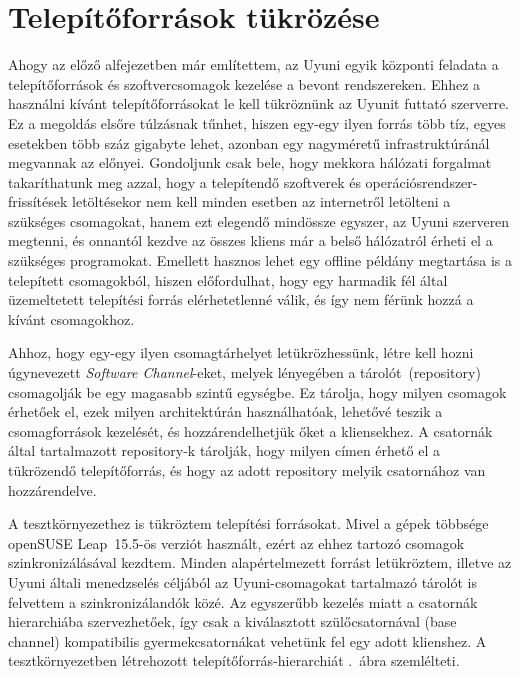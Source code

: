 \section{Telepítőforrások tükrözése}
\label{sect:reposync}
Ahogy az előző alfejezetben már említettem, az Uyuni egyik központi feladata a telepítőforrások és szoftvercsomagok kezelése a bevont rendszereken. Ehhez a használni kívánt telepítőforrásokat le kell tükröznünk az Uyunit futtató szerverre. Ez a megoldás elsőre túlzásnak tűnhet, hiszen egy-egy ilyen forrás több tíz, egyes esetekben több száz gigabyte lehet, azonban egy nagyméretű infrastruktúránál megvannak az előnyei. Gondoljunk csak bele, hogy mekkora hálózati forgalmat takaríthatunk meg azzal, hogy a telepítendő szoftverek és operációsrendszer-frissítések letöltésekor nem kell minden esetben az internetről letölteni a szükséges csomagokat, hanem ezt elegendő mindössze egyszer, az Uyuni szerveren megtenni, és onnantól kezdve az összes kliens már a belső hálózatról érheti el a szükséges programokat.
Emellett hasznos lehet egy offline példány megtartása is a telepített csomagokból, hiszen előfordulhat, hogy egy harmadik fél által üzemeltetett telepítési forrás elérhetetlenné válik, és így nem férünk hozzá a kívánt csomagokhoz.

Ahhoz, hogy egy-egy ilyen csomagtárhelyet letükrözhessünk, létre kell hozni úgynevezett \textit{Software Channel}-eket, melyek lényegében a tárolót~(repository) csomagolják be egy magasabb szintű egységbe. Ez tárolja, hogy milyen csomagok érhetőek el, ezek milyen architektúrán használhatóak, lehetővé teszik a csomagforrások kezelését, és hozzárendelhetjük őket a kliensekhez. A csatornák által tartalmazott repository-k tárolják, hogy milyen címen érhető el a tükrözendő telepítőforrás, és hogy az adott repository melyik csatornához van hozzárendelve.

A tesztkörnyezethez is tükröztem telepítési forrásokat. Mivel a gépek többsége openSUSE Leap~15.5-ös verziót használt, ezért az ehhez tartozó csomagok szinkronizálásával kezdtem. Minden alapértelmezett forrást letükröztem, illetve az Uyuni általi menedzselés céljából az Uyuni-csomagokat tartalmazó tárolót is felvettem a szinkronizálandók közé. Az egyszerűbb kezelés miatt a csatornák hierarchiába szervezhetőek, így csak a kiválasztott szülőcsatornával (base channel) kompatibilis gyermekcsatornákat vehetünk fel egy adott klienshez. A tesztkörnyezetben létrehozott telepítőforrás-hierarchiát .~ábra szemlélteti.

